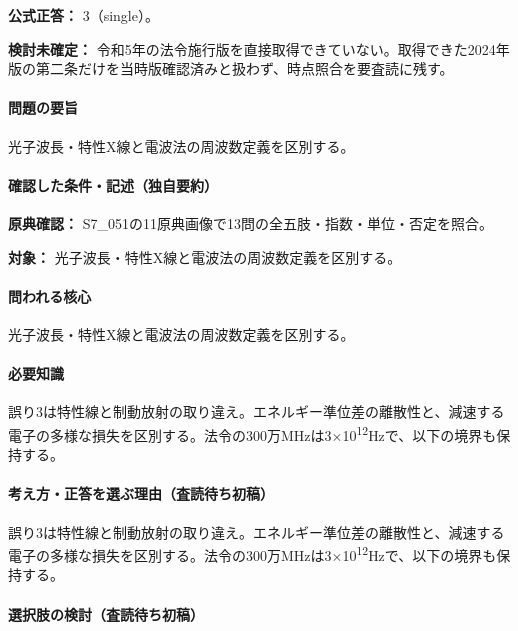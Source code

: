 \textbf{公式正答：} 3（single）。

\par\textbf{検討未確定：} 令和5年の法令施行版を直接取得できていない。取得できた2024年版の第二条だけを当時版確認済みと扱わず、時点照合を要査読に残す。

\paragraph{問題の要旨} 光子波長・特性X線と電波法の周波数定義を区別する。

\paragraph{確認した条件・記述（独自要約）}\mbox{}\par

\noindent\textbf{原典確認：} S7\_051の11原典画像で13問の全五肢・指数・単位・否定を照合。\par

\noindent\textbf{対象：} 光子波長・特性X線と電波法の周波数定義を区別する。\par

\paragraph{問われる核心} 光子波長・特性X線と電波法の周波数定義を区別する。

\paragraph{必要知識} 誤り3は特性線と制動放射の取り違え。エネルギー準位差の離散性と、減速する電子の多様な損失を区別する。法令の300万MHzは3×10\textsuperscript{12}Hzで、以下の境界も保持する。

\paragraph{考え方・正答を選ぶ理由（査読待ち初稿）} 誤り3は特性線と制動放射の取り違え。エネルギー準位差の離散性と、減速する電子の多様な損失を区別する。法令の300万MHzは3×10\textsuperscript{12}Hzで、以下の境界も保持する。

\paragraph{選択肢の検討（査読待ち初稿）}\mbox{}\par

